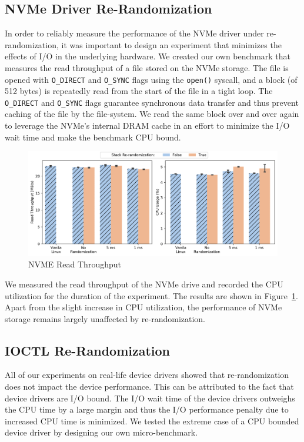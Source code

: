 \subsection{NVMe Driver Re-Randomization}
In order to reliably measure the performance of the NVMe driver under re-randomization, it was important to design an experiment that minimizes the effects of I/O in the underlying hardware. We created our own benchmark that measures the read throughput of a file stored on the NVMe storage. The file is opened with \verb|O_DIRECT| and \verb|O_SYNC| flags using the \verb|open()| syscall, and a block (of 512 bytes) is repeatedly read from the start of the file in a tight loop. The \verb|O_DIRECT| and \verb|O_SYNC| flags guarantee synchronous data transfer and thus prevent caching of the file by the file-system. We read the same block over and over again to leverage the NVMe's internal DRAM cache in an effort to minimize the I/O wait time and make the benchmark CPU bound.

\begin{figure}[ht!]
\centering
\includegraphics[width=\columnwidth]{charts/nvme_read.pdf}
\caption{NVME Read Throughput}
\label{fig:nvme_read}
\end{figure}

We measured the read throughput of the NVMe drive and recorded the CPU utilization for the duration of the experiment. The results are shown in Figure~\ref{fig:nvme_read}. Apart from the slight increase in CPU utilization, the performance of NVMe storage remains largely unaffected by re-randomization.

\subsection{IOCTL Re-Randomization}
All of our experiments on real-life device drivers showed that re-randomization does not impact the device performance. This can be attributed to the fact that device drivers are I/O bound. The I/O wait time of the device drivers outweighs the CPU time by a large margin and thus the I/O performance penalty due to increased CPU time is minimized. We tested the extreme case of a CPU bounded device driver by designing our own micro-benchmark.

